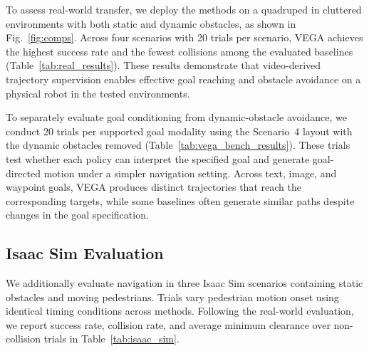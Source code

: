 To assess real-world transfer, we deploy the methods on a quadruped in cluttered environments with both static and dynamic obstacles, as shown in Fig.~\ref{fig:comps}.
Across four scenarios with 20 trials per scenario, VEGA achieves the highest success rate and the fewest collisions among the evaluated baselines (Table~\ref{tab:real_results}). 
These results demonstrate that video-derived trajectory supervision enables effective goal reaching and obstacle avoidance on a physical robot in the tested environments.

To separately evaluate goal conditioning from dynamic-obstacle avoidance, we conduct 20 trials per supported goal modality using the Scenario~4 layout with the dynamic obstacles removed (Table~\ref{tab:vega_bench_results}).
These trials test whether each policy can interpret the specified goal and generate goal-directed motion under a simpler navigation setting.
Across text, image, and waypoint goals, VEGA produces distinct trajectories that reach the corresponding targets, while some baselines often generate similar paths despite changes in the goal specification.

\subsection{Isaac Sim Evaluation}

We additionally evaluate navigation in three Isaac Sim scenarios containing static obstacles and moving pedestrians.
Trials vary pedestrian motion onset using identical timing conditions across methods.
Following the real-world evaluation, we report success rate, collision rate, and average minimum clearance over non-collision trials in Table~\ref{tab:isaac_sim}.

